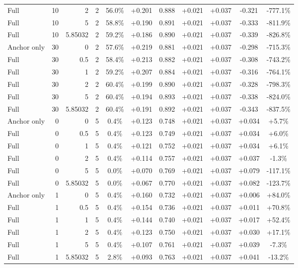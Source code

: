 \begin{table}[htbp]
\begin{tabular}{lrrrccccccc}
Full & 10 & 2 & 2 & 56.0\% & +0.201 & 0.888 & +0.021 & +0.037 & -0.321 & -777.1\% \\
Full & 10 & 5 & 2 & 58.8\% & +0.190 & 0.891 & +0.021 & +0.037 & -0.333 & -811.9\% \\
Full & 10 & 5.85032 & 2 & 59.2\% & +0.186 & 0.890 & +0.021 & +0.037 & -0.339 & -826.8\% \\
Anchor only & 30 & 0 & 2 & 57.6\% & +0.219 & 0.881 & +0.021 & +0.037 & -0.298 & -715.3\% \\
Full & 30 & 0.5 & 2 & 58.4\% & +0.213 & 0.882 & +0.021 & +0.037 & -0.308 & -743.2\% \\
Full & 30 & 1 & 2 & 59.2\% & +0.207 & 0.884 & +0.021 & +0.037 & -0.316 & -764.1\% \\
Full & 30 & 2 & 2 & 60.4\% & +0.199 & 0.890 & +0.021 & +0.037 & -0.328 & -798.3\% \\
Full & 30 & 5 & 2 & 60.4\% & +0.194 & 0.893 & +0.021 & +0.037 & -0.338 & -824.0\% \\
Full & 30 & 5.85032 & 2 & 60.4\% & +0.191 & 0.892 & +0.021 & +0.037 & -0.343 & -837.5\% \\
Anchor only & 0 & 0 & 5 & 0.4\% & +0.123 & 0.748 & +0.021 & +0.037 & +0.034 & +5.7\% \\
Full & 0 & 0.5 & 5 & 0.4\% & +0.123 & 0.749 & +0.021 & +0.037 & +0.034 & +6.0\% \\
Full & 0 & 1 & 5 & 0.4\% & +0.121 & 0.752 & +0.021 & +0.037 & +0.034 & +6.1\% \\
Full & 0 & 2 & 5 & 0.4\% & +0.114 & 0.757 & +0.021 & +0.037 & +0.037 & -1.3\% \\
Full & 0 & 5 & 5 & 0.0\% & +0.070 & 0.769 & +0.021 & +0.037 & +0.079 & -117.1\% \\
Full & 0 & 5.85032 & 5 & 0.0\% & +0.067 & 0.770 & +0.021 & +0.037 & +0.082 & -123.7\% \\
Anchor only & 1 & 0 & 5 & 0.4\% & +0.160 & 0.732 & +0.021 & +0.037 & +0.006 & +84.0\% \\
Full & 1 & 0.5 & 5 & 0.4\% & +0.154 & 0.736 & +0.021 & +0.037 & +0.011 & +70.8\% \\
Full & 1 & 1 & 5 & 0.4\% & +0.144 & 0.740 & +0.021 & +0.037 & +0.017 & +52.4\% \\
Full & 1 & 2 & 5 & 0.4\% & +0.123 & 0.750 & +0.021 & +0.037 & +0.030 & +17.1\% \\
Full & 1 & 5 & 5 & 0.4\% & +0.107 & 0.761 & +0.021 & +0.037 & +0.039 & -7.3\% \\
Full & 1 & 5.85032 & 5 & 2.8\% & +0.093 & 0.763 & +0.021 & +0.037 & +0.041 & -13.2\% \\

\end{tabular}
\end{table}

